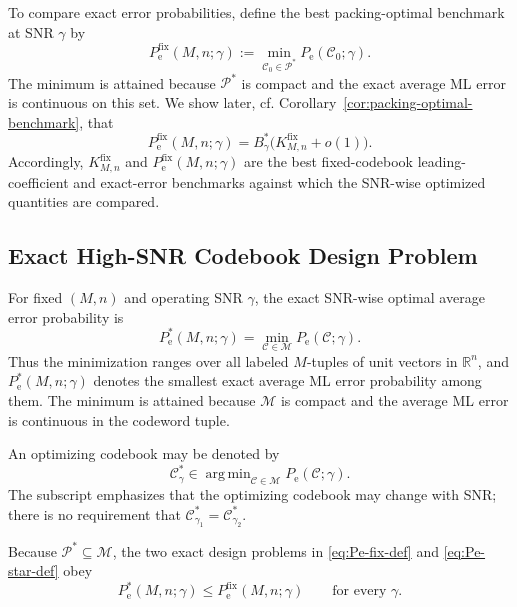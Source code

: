 \documentclass[12pt,draftclsnofoot,onecolumn]{IEEEtran}
\DeclareMathOperator*{\argmin}{arg\,min}
\newcommand{\R}{\mathbb{R}}
\newcommand{\cC}{\mathcal{C}}
\newcommand{\cM}{\mathcal{M}}
\newcommand{\cP}{\mathcal{P}}
\newcommand{\Pe}{P_{\mathrm e}}
\theoremstyle{definition}
\begin{document}
To compare exact error probabilities, define the best packing-optimal
benchmark at SNR \(\gamma\) by
\begin{equation}
  \Pe^{\mathrm{fix}}(M,n;\gamma)
  :=\min_{\cC_0\in\cP^{\ast}}\Pe(\cC_0;\gamma).
  \label{eq:Pe-fix-def}
\end{equation}
The minimum is attained because \(\cP^{\ast}\) is compact and the exact
average ML error is continuous on this set.  We show later, cf.
Corollary~\ref{cor:packing-optimal-benchmark}, that
\begin{equation}
  \Pe^{\mathrm{fix}}(M,n;\gamma)
  =B_\gamma^{\ast}
  \bigl(K^{\mathrm{fix}}_{M,n}+o(1)\bigr).
  \label{eq:Pe-fix-asymptotic}
\end{equation}
Accordingly, \(K^{\mathrm{fix}}_{M,n}\) and
\(\Pe^{\mathrm{fix}}(M,n;\gamma)\) are the best fixed-codebook
leading-coefficient and exact-error benchmarks against which the SNR-wise
optimized quantities are compared.

\subsection{Exact High-SNR Codebook Design Problem}
\label{subsec:exact-design-problem}

For fixed \((M,n)\) and operating SNR \(\gamma\), the exact
SNR-wise optimal average error probability is
\begin{equation}
  \Pe^{\ast}(M,n;\gamma)
  =\min_{\cC\in\cM}\Pe(\cC;\gamma).
  \label{eq:Pe-star-def}
\end{equation}
Thus the minimization ranges over all labeled \(M\)-tuples of unit
vectors in \(\R^n\), and
\(\Pe^{\ast}(M,n;\gamma)\) denotes the smallest exact average ML error
probability among them.  The minimum is attained because \(\cM\) is
compact and the average ML error is continuous in the codeword tuple.

An optimizing codebook may be denoted by
\begin{equation*}
  \cC_\gamma^{\ast}
  \in\argmin_{\cC\in\cM}\Pe(\cC;\gamma).
\end{equation*}
The subscript emphasizes that the optimizing codebook may change with
SNR; there is no requirement that
\(\cC_{\gamma_1}^{\ast}=\cC_{\gamma_2}^{\ast}\).

Because \(\cP^{\ast}\subseteq\cM\), the two exact design problems in
\eqref{eq:Pe-fix-def} and \eqref{eq:Pe-star-def} obey
\begin{equation}
  \Pe^{\ast}(M,n;\gamma)
  \leq\Pe^{\mathrm{fix}}(M,n;\gamma)
  \qquad\text{for every \(\gamma\)}.
  \label{eq:Pe-star-le-Pe-fix}
\end{equation}
\end{document}
